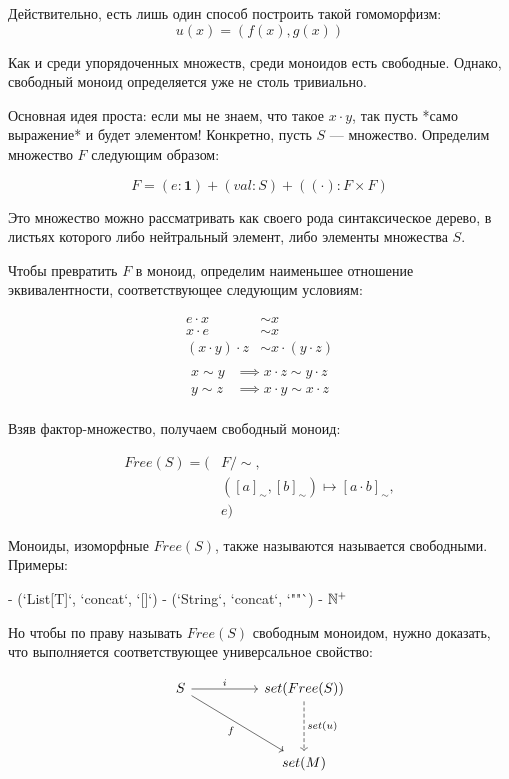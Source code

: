\documentclass[10pt, a4paper]{article}
\theoremstyle{colon}
\begin{document}
Действительно, есть лишь один способ построить такой гомоморфизм:
\[
u(x) = (f(x), g(x))
\]

Как и среди упорядоченных множеств, среди моноидов есть свободные. Однако, свободный моноид определяется
уже не столь тривиально.

Основная идея проста: если мы не знаем, что такое \( x \cdot y \), так пусть *само
выражение* и будет элементом! Конкретно, пусть \( S \) — множество. Определим
множество \( F \) следующим образом:

\[
F = (e: \bm 1) + (val: S) + ((\cdot): F \times F)
\]

Это множество можно рассматривать как своего рода синтаксическое дерево, в листьях которого либо
нейтральный элемент, либо элементы множества \( S \).

Чтобы превратить \( F \) в моноид, определим наименьшее отношение эквивалентности, соответствующее следующим условиям:

\begin{align*}
e \cdot x &\sim x \\
x \cdot e &\sim x \\
(x \cdot y) \cdot z &\sim x \cdot (y \cdot z) \\
\end{align*}
\qquad
\begin{align*}
x \sim y &\implies x \cdot z \sim y \cdot z \\
y \sim z &\implies x \cdot y \sim x \cdot z \\
\,
\end{align*}

Взяв фактор-множество, получаем свободный моноид:

\begin{align*}
Free(S) = (
  &F/{\sim},\\
  &([a]_\sim, [b]_\sim) \mapsto [a \cdot b]_\sim,\\
  &e
)
\end{align*}

Моноиды, изоморфные \( Free(S) \), также называются называется свободными. Примеры:

- (`List[T]`, `concat`, `[]`)
- (`String`, `concat`, `""`)
- \( \Bbb N^{+} \)

Но чтобы по праву называть \( Free(S) \) свободным моноидом, нужно доказать, что
выполняется соответствующее универсальное свойство:

\[\begin{tikzcd}
	S && {set(Free(S))} \\
	\\
	&& {set(M)}
	\arrow["{set(u)}", dashed, from=1-3, to=3-3]
	\arrow["i", from=1-1, to=1-3]
	\arrow["f"', from=1-1, to=3-3]
\end{tikzcd}\]
\end{document}
